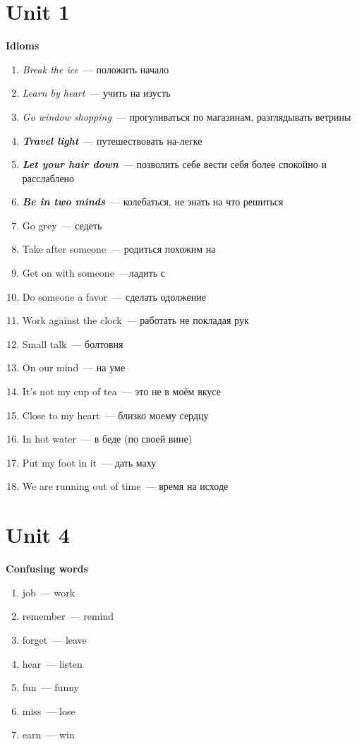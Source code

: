 \documentclass[10pt,a4paper]{article}
\begin{document}
\twocolumn[]
\section{Unit 1}
\textbf{Idioms}

\begin{enumerate}
 \item \textit{Break the ice}~--- положить начало 
 \item \textit{Learn by heart}~--- учить на изусть
 \item \textit{Go window shopping}~--- прогуливаться по магазинам, разглядывать ветрины
 \item \textit{\textbf{Travel light}}~--- путешествовать на-легке
 \item \textit{\textbf{Let your hair down}}~--- позволить себе вести себя более спокойно и расслаблено
 \item \textit{\textbf{Be in two minds}}~--- колебаться, не знать на что решиться
 \item Go grey~--- седеть
 \item Take after someone~--- родиться похожим на
 \item Get on with someone~---ладить с 
 \item Do someone a favor~--- сделать одолжение
 \item Work against the clock~--- работать не покладая рук
 \item Small talk~--- болтовня
 \item On our mind~--- на уме
 \item It's not my cup of tea~--- это не в моём вкусе
 \item Close to my heart~--- близко моему сердцу
 \item In hot water~--- в беде (по своей вине)
 \item Put my foot in it~--- дать маху
 \item We are running out of time~--- время на исходе
\end{enumerate}



\section{Unit 4}

\textbf{Confusing words}
\begin{enumerate}
  \item job~--- work
  \item remember~--- remind
  \item forget~--- leave
  \item hear~--- listen
  \item fun~--- funny
  \item miss~--- lose
  \item earn~--- win
\end{enumerate}
\end{document}
